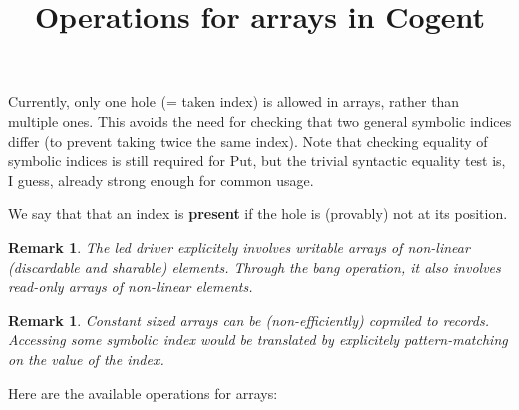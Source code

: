 \documentclass{article}
\title{Operations for arrays in Cogent}
\newtheorem{remark}[theorem]{Remark}
\begin{document}
\maketitle

Currently, only one hole (= taken index) is allowed in arrays, rather than
multiple ones. This avoids the need for checking that two general symbolic
indices differ (to prevent taking twice the same index).
Note that checking equality of symbolic indices is still required for Put, but
the trivial syntactic equality test is, I guess, already strong enough for
common usage.

We say that that an index is \textbf{present} if the hole is (provably) not at its
position.

\begin{remark}
  The led driver explicitely involves writable arrays of non-linear (discardable and sharable) elements.
  Through the bang operation, it also involves read-only arrays of non-linear
  elements.
\end{remark}
\begin{remark}
 Constant sized arrays can be (non-efficiently) copmiled to records. Accessing some symbolic index 
 would be translated by explicitely pattern-matching on the value of the index.
\end{remark}
Here are the available operations for arrays:
\end{document}
